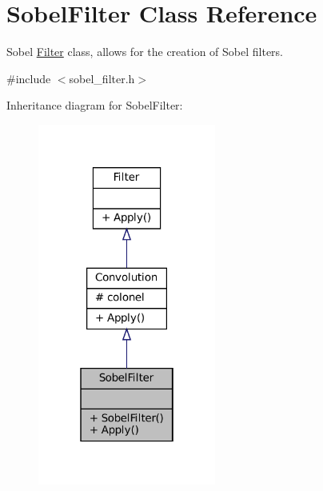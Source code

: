 \hypertarget{classSobelFilter}{}\section{Sobel\+Filter Class Reference}
\label{classSobelFilter}


Sobel \hyperlink{classFilter}{Filter} class, allows for the creation of Sobel filters.  




{\ttfamily \#include $<$sobel\+\_\+filter.\+h$>$}



Inheritance diagram for Sobel\+Filter\+:
\nopagebreak
\begin{figure}[H]
\begin{center}
\leavevmode
\includegraphics[width=166pt]{classSobelFilter__inherit__graph}
\end{center}
\end{figure}


